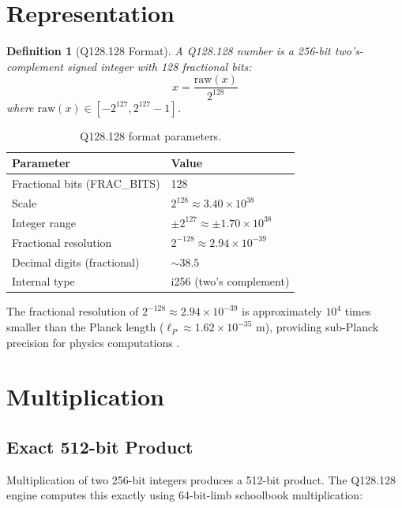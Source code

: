 \documentclass[11pt]{article}
\newtheorem{definition}{Definition}
\begin{document}
\section{Representation}

\begin{definition}[Q128.128 Format]
A Q128.128 number is a 256-bit two's-complement signed integer with 128 fractional bits:
\begin{equation}
x = \frac{\text{raw}(x)}{2^{128}}
\end{equation}
where $\text{raw}(x) \in [-2^{127}, 2^{127} - 1]$.
\end{definition}

\begin{table}[ht]
\centering
\caption{Q128.128 format parameters.}
\label{tab:format}
\begin{tabular}{ll}
\toprule
Parameter & Value \\
\midrule
Fractional bits (FRAC\_BITS) & 128 \\
Scale & $2^{128} \approx 3.40 \times 10^{38}$ \\
Integer range & $\pm 2^{127} \approx \pm 1.70 \times 10^{38}$ \\
Fractional resolution & $2^{-128} \approx 2.94 \times 10^{-39}$ \\
Decimal digits (fractional) & $\sim 38.5$ \\
Internal type & i256 (two's complement) \\
\bottomrule
\end{tabular}
\end{table}

The fractional resolution of $2^{-128} \approx 2.94 \times 10^{-39}$ is approximately $10^4$ times smaller than the Planck length ($\ell_P \approx 1.62 \times 10^{-35}$ m), providing sub-Planck precision for physics computations \cite{higham_2002}.

\section{Multiplication}

\subsection{Exact 512-bit Product}

Multiplication of two 256-bit integers produces a 512-bit product. The Q128.128 engine computes this exactly using 64-bit-limb schoolbook multiplication:
\end{document}
